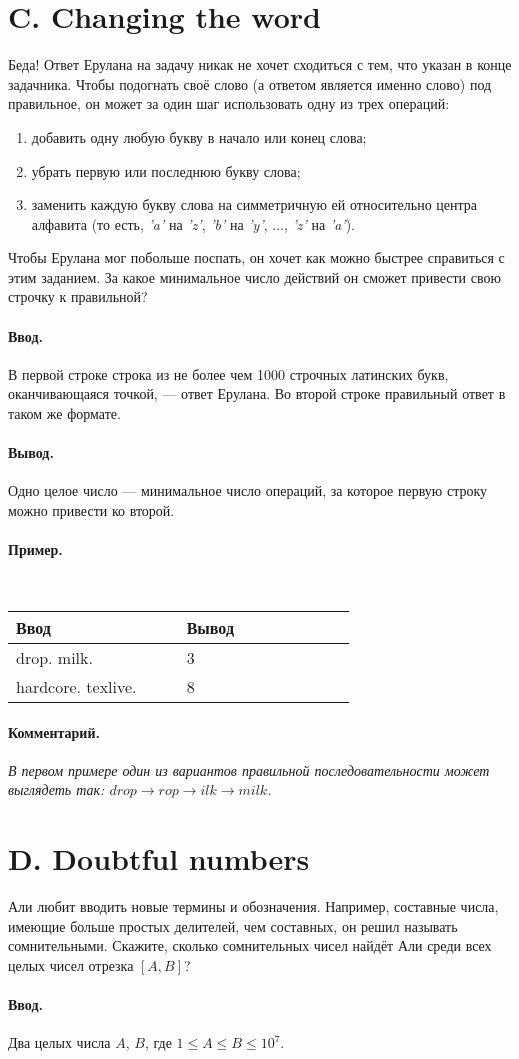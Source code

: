 \documentclass[12pt, a5paper]{article}
\newcommand{\informat}[1]
{
	\paragraph{Ввод.\\} #1
}
\newcommand{\outformat}[1]
{
	\paragraph{Вывод.\\} #1
}
\newcommand{\examplee}[4]
{
	\paragraph{Пример.\\}
	{\tt
	\begin{tabular}{|p{0.4\linewidth}|p{0.4\linewidth}|}
	\hline
	Ввод 	& Вывод  	\\
	\hline
	#1 		& #2 		\\
	\hline
	#3		& #4		\\
	\hline
	\end{tabular}
	}
}
\newcommand{\excomm}[1]
{
	\paragraph{Комментарий. \\}
	\textit{#1}
}
\begin{document}
\section*{C. Changing the word}

Беда! Ответ Ерулана на задачу никак не хочет сходиться с тем, что указан в конце задачника. Чтобы подогнать своё слово (а ответом является именно слово) под правильное, он может за один шаг использовать одну из трех операций:
\begin{enumerate}
\item добавить одну любую букву в начало или конец слова;
\item убрать первую или последнюю букву слова;
\item заменить каждую букву слова на симметричную ей относительно центра алфавита (то есть, \textit{'a'} на \textit{'z'}, \textit{'b'} на \textit{'y'}, $\dots$, \textit{'z'} на \textit{'a'}).
\end{enumerate}
Чтобы Ерулана мог побольше поспать, он хочет как можно быстрее справиться с этим заданием. За какое минимальное число действий он сможет привести свою строчку к правильной?

\informat{В первой строке строка из не более чем 1000 строчных латинских букв, оканчивающаяся точкой, --- ответ Ерулана. \newline 
Во второй строке правильный ответ в таком же формате.}

\outformat{Одно целое число --- минимальное число операций, за которое первую строку можно привести ко второй.}

\examplee{drop. \newline milk.}{3}{hardcore. \newline texlive.}{8}

\excomm{В первом примере один из вариантов правильной последовательности может выглядеть так: $drop \rightarrow rop \rightarrow ilk \rightarrow milk$.}



\section*{D. Doubtful numbers}

Али любит вводить новые термины и обозначения. Например, составные числа, имеющие больше простых делителей, чем составных, он решил называть сомнительными. Скажите, сколько сомнительных чисел найдёт Али среди всех целых чисел отрезка $[A, B]$?

\informat{Два целых числа $A$, $B$, где $1 \le A \le B \le 10^7$.}
\end{document}
